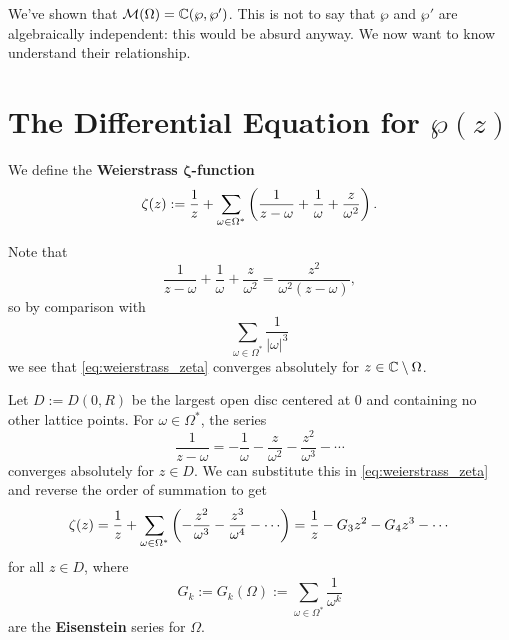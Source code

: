 \documentclass[11pt]{article}
\begin{document}
We've shown that $\mathcal M(\Omega) = \mathbb{C}(\wp, \wp')$. This is not to say that $\wp$ and $\wp'$ are algebraically independent: this would be absurd anyway. We now want to know understand their relationship.

\section{\texorpdfstring{The Differential Equation for $\wp(z)$}{The Differential Equation for p(z)}}

\begin{defn}
    We define the \textbf{Weierstrass $\bm \zeta$-function}
    \begin{align} \label{eq:weierstrass_zeta}
        \zeta(z) := \frac{1}{z}+\sum_{\omega \in \Omega^*}\paren{\frac{1}{z-\omega}+\frac{1}{\omega}+\frac{z}{\omega^2}}.
    \end{align}
\end{defn}
    Note that
    $$\frac{1}{z-\omega}+\frac{1}{\omega}+\frac{z}{\omega^2}=\frac{z^2}{\omega^2(z-\omega)},$$
    so by comparison with 
    $$\sum_{\omega \in \Omega^*}\frac{1}{|\omega|^3}$$
    we see that \eqref{eq:weierstrass_zeta} converges absolutely for $z \in \mathbb{C} \setminus \Omega$.

    Let $D:=D(0,R)$ be the largest open disc centered at $0$ and containing no other lattice points. For $\omega \in \Omega^*$, the series
    $$\frac{1}{z-\omega}=-\frac{1}{\omega}-\frac{z}{\omega^2}-\frac{z^2}{\omega^3}-\cdots$$
    converges absolutely for $z \in D$. We can substitute this in \eqref{eq:weierstrass_zeta} and reverse the order of summation to get
    $$\zeta(z) = \frac{1}{z} +\sum_{\omega \in \Omega^*}\paren{ -\frac{z^2}{\omega^3} - \frac{z^3}{\omega^4}-\cdots }= \frac{1}{z}-G_3z^2 - G_4z^3-\cdots $$
    for all $z \in D$, where
    $$G_k:=G_k(\Omega):= \sum_{\omega \in \Omega^*}\frac{1}{\omega^k}$$
    are the \textbf{Eisenstein} series for $\Omega$.
\end{document}
